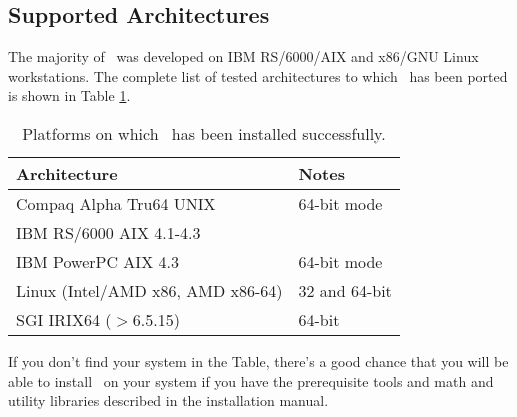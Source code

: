 \subsection{Supported Architectures}
The majority of \PSIthree\ was developed on IBM RS/6000/AIX
and x86/GNU Linux workstations. The complete list of
tested architectures to which \PSIthree\ has
been ported is shown in Table \ref{table:ports}.
\begin{table}[h]
\caption{Platforms on which \PSIthree\ has been installed successfully.}
\label{table:ports}
\begin{center}
\begin{tabular}{ll} \hline\hline
Architecture              &  Notes \\ \hline
Compaq Alpha Tru64 UNIX   & 64-bit mode \\
IBM RS/6000 AIX 4.1-4.3   & \\
IBM PowerPC AIX 4.3       & 64-bit mode \\
Linux (Intel/AMD x86, AMD x86-64)  & 32 and 64-bit\\
SGI IRIX64 ($>$6.5.15)    & 64-bit \\ \hline\hline
\end{tabular}
\end{center}
\end{table}
If you don't find your system in the Table, there's a good chance
that you will be able to install \PSIthree\ on your system
if you have the prerequisite tools and math and utility libraries described 
in the installation manual.

